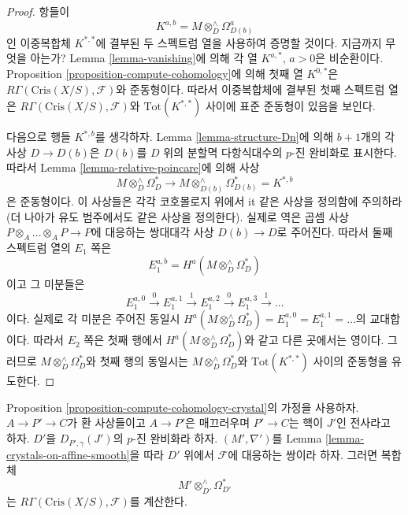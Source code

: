 \begin{proof}
항들이
$$
K^{a, b} = M \otimes_D^\wedge \Omega^a_{D(b)}
$$
인 이중복합체 $K^{*, *}$에 결부된 두 스펙트럼 열을 사용하여
증명할 것이다. 지금까지 무엇을 아는가? Lemma
\ref{lemma-vanishing}에 의해 각 열 $K^{a, *}$, $a > 0$은
비순환이다. Proposition \ref{proposition-compute-cohomology}에 의해
첫째 열 $K^{0, *}$은
$R\Gamma(\text{Cris}(X/S), \mathcal{F})$와 준동형이다. 따라서
이중복합체에 결부된 첫째 스펙트럼 열은
$R\Gamma(\text{Cris}(X/S), \mathcal{F})$와
$\text{Tot}(K^{*, *})$ 사이에 표준 준동형이 있음을 보인다.

\medskip\noindent
다음으로 행들 $K^{*, b}$를 생각하자. Lemma
\ref{lemma-structure-Dn}에 의해 $b + 1$개의 각 사상
$D \to D(b)$은 $D(b)$를 $D$ 위의 분할멱 다항식대수의 $p$-진
완비화로 표시한다. 따라서 Lemma \ref{lemma-relative-poincare}에
의해 사상
$$
M \otimes^\wedge_D\Omega^*_D
\longrightarrow
M \otimes^\wedge_{D(b)} \Omega^*_{D(b)} = K^{*, b}
$$
은 준동형이다. 이 사상들은 각각 코호몰로지 위에서 {it 같은}
사상을 정의함에 주의하라(더 나아가 유도 범주에서도 같은
사상을 정의한다). 실제로 역은 곱셈 사상
$P \otimes_A \ldots \otimes_A P \to P$에 대응하는 쌍대대각 사상
$D(b) \to D$로 주어진다. 따라서 둘째 스펙트럼 열의 $E_1$ 쪽은
$$
E_1^{a, b} = H^a(M \otimes^\wedge_D\Omega^*_D)
$$
이고 그 미분들은
$$
E_1^{a, 0} \xrightarrow{0}
E_1^{a, 1} \xrightarrow{1}
E_1^{a, 2} \xrightarrow{0}
E_1^{a, 3} \xrightarrow{1} \ldots
$$
이다. 실제로 각 미분은 주어진 동일시
$H^a(M \otimes^\wedge_D\Omega^*_D) = E_1^{a, 0} = E_1^{a, 1} = \ldots$의
교대합이다. 따라서 $E_2$ 쪽은 첫째 행에서
$H^a(M \otimes^\wedge_D\Omega^*_D)$와 같고 다른 곳에서는 영이다.
그러므로 $M \otimes^\wedge_D\Omega^*_D$와 첫째 행의 동일시는
$M \otimes^\wedge_D\Omega^*_D$와 $\text{Tot}(K^{*, *})$ 사이의
준동형을 유도한다.
\end{proof}

\begin{lemma}
\label{lemma-compute-cohomology-crystal-smooth}
Proposition \ref{proposition-compute-cohomology-crystal}의 가정을
사용하자. $A \to P' \to C$가 환 사상들이고 $A \to P'$은
매끄러우며 $P' \to C$는 핵이 $J'$인 전사라고 하자. $D'$을
$D_{P', \gamma}(J')$의 $p$-진 완비화라 하자. $(M', \nabla')$를
Lemma \ref{lemma-crystals-on-affine-smooth}을 따라 $D'$ 위에서
$\mathcal{F}$에 대응하는 쌍이라 하자. 그러면 복합체
$$
M' \otimes^\wedge_{D'} \Omega^*_{D'}
$$
는 $R\Gamma(\text{Cris}(X/S), \mathcal{F})$를 계산한다.
\end{lemma}

